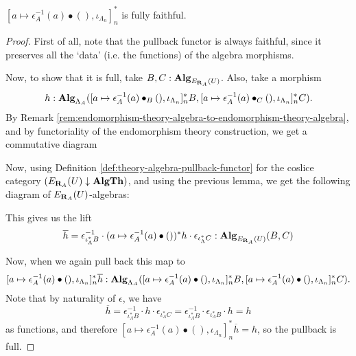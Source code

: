 \begin{lemma}\label{lem:pullback-fully-faithful}
  $ [a \mapsto \epsilon_A^{-1}(a) \bullet (), \iota_{\Lambda_n}]_n^* $ is fully faithful.
\end{lemma}
\begin{proof}
  First of all, note that the pullback functor is always faithful, since it preserves all the `data' (i.e. the functions) of the algebra morphisms.

  Now, to show that it is full, take $ B, C: \mathbf{Alg}_{E_{\mathbf{R}_A}(U)} $. Also, take a morphism
  \[ h : \mathbf{Alg}_{\Lambda_A}([a \mapsto \epsilon_A^{-1}(a) \bullet_B (), \iota_{\Lambda_n}]_n^* B, [a \mapsto \epsilon_A^{-1}(a) \bullet_C (), \iota_{\Lambda_n}]_n^* C). \]
  By Remark \ref{rem:endomorphism-theory-algebra-to-endomorphism-theory-algebra}, and by functoriality of the endomorphism theory construction, we get a commutative diagram
  \begin{center}
  \end{center}
  Now, using Definition \ref{def:theory-algebra-pullback-functor} for the coslice category $ (E_{\mathbf{R}_A}(U) \downarrow \mathbf{AlgTh}) $, and using the previous lemma, we get the following diagram of $ E_{\mathbf{R}_A}(U) $-algebras:
  \begin{center}
  \end{center}
  This gives us the lift
  \[ \overline h = \epsilon_{\iota_\Lambda^* B}^{-1} \cdot (a \mapsto \epsilon_A^{-1}(a) \bullet ())^* h \cdot \epsilon_{\iota_\Lambda^* C} : \mathbf{Alg}_{E_{\mathbf{R}_A}(U)}(B, C) \]

  Now, when we again pull back this map to
  \[ [a \mapsto \epsilon_A^{-1}(a) \bullet (), \iota_{\Lambda_n}]_n^* \overline h : \mathbf{Alg}_{\Lambda_A}([a \mapsto \epsilon_A^{-1}(a) \bullet (), \iota_{\Lambda_n}]_n^* B, [a \mapsto \epsilon_A^{-1}(a) \bullet (), \iota_{\Lambda_n}]_n^* C). \]
  Note that by naturality of $ \epsilon $, we have
  \[ \overline h = \epsilon_{\iota_\Lambda^* B}^{-1} \cdot h \cdot \epsilon_{\iota_\Lambda^* C} = \epsilon_{\iota_\Lambda^* B}^{-1} \cdot \epsilon_{\iota_\Lambda^* B} \cdot h = h \]
  as functions, and therefore $ [a \mapsto \epsilon_A^{-1}(a) \bullet (), \iota_{\Lambda_n}]_n^* \overline h = h $, so the pullback is full.
\end{proof}

